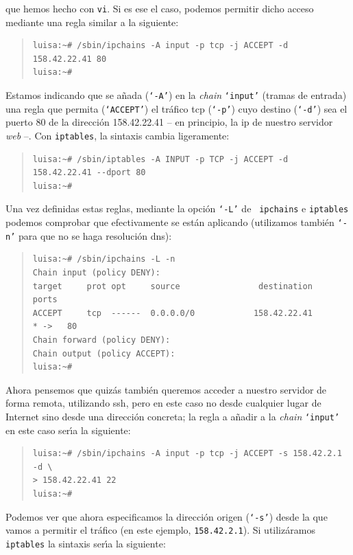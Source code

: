 que hemos hecho con {\tt vi}. Si es ese el caso, podemos permitir dicho acceso
mediante una regla similar a la siguiente:
\begin{quote}
\begin{verbatim}
luisa:~# /sbin/ipchains -A input -p tcp -j ACCEPT -d 158.42.22.41 80
luisa:~# 
\end{verbatim}
\end{quote}
Estamos indicando que se a\~nada ({\tt `-A'}) en la {\it chain} {\tt `input'} 
(tramas de entrada)
una regla que permita ({\tt `ACCEPT'}) el tr\'afico {\sc tcp} ({\tt `-p'}) cuyo
destino ({\tt `-d'}) sea el puerto 80 de la direcci\'on 158.42.22.41 -- en
principio, la {\sc ip} de nuestro servidor {\it web} --. Con {\tt iptables}, la
sintaxis cambia ligeramente:
\begin{quote}
\begin{verbatim}
luisa:~# /sbin/iptables -A INPUT -p TCP -j ACCEPT -d 158.42.22.41 --dport 80
luisa:~#
\end{verbatim}
\end{quote}
Una vez definidas estas reglas, mediante la opci\'on {\tt `-L'} de {\tt 
ipchains} e {\tt iptables} podemos comprobar que efectivamente se est\'an 
aplicando (utilizamos tambi\'en {\tt `-n'} para que no se haga resoluci\'on
{\sc dns}):
\begin{quote}
\begin{verbatim}
luisa:~# /sbin/ipchains -L -n
Chain input (policy DENY):
target     prot opt     source                destination           ports
ACCEPT     tcp  ------  0.0.0.0/0            158.42.22.41          * ->   80
Chain forward (policy DENY):
Chain output (policy ACCEPT):
luisa:~# 
\end{verbatim}
\end{quote}
Ahora pensemos que quiz\'as tambi\'en queremos acceder a nuestro servidor de
forma remota, utilizando {\sc ssh}, pero en este caso no desde cualquier lugar
de Internet sino desde una direcci\'on concreta; la regla a a\~nadir a la {\it
chain} {\tt `input'} en este caso ser\'{\i}a la siguiente:
\begin{quote}
\begin{verbatim}
luisa:~# /sbin/ipchains -A input -p tcp -j ACCEPT -s 158.42.2.1 -d \
> 158.42.22.41 22
luisa:~#
\end{verbatim}
\end{quote}
Podemos ver que ahora especificamos la direcci\'on origen ({\tt `-s'}) desde
la que vamos a permitir el tr\'afico (en este ejemplo, {\tt 158.42.2.1}). Si
utiliz\'aramos {\tt iptables} la sintaxis ser\'{\i}a la siguiente:
